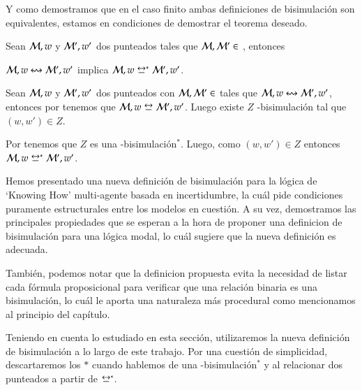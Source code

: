 Y como demostramos que en el caso finito ambas definiciones de bisimulación son equivalentes, estamos en condiciones de demostrar el teorema deseado. 

\begin{teorema}\label{thm:new-bisim-finite-equiv}
    Sean $\mathcal{M},w$ y $\mathcal{M}',w'$ dos \ultss punteados tales que $\mathcal{M}, \mathcal{M}' \in$ \MFD, entonces
    \begin{center}
        $\mathcal{M},w \mathrel{\leftrightsquigarrow} \mathcal{M}', w'$ implica $\model,w \bisim^* \model', w'$.
    \end{center}
\end{teorema}

\begin{demostracion}
    Sean $\mathcal{M},w$ y $\mathcal{M}',w'$ dos \ultss punteados con $\mathcal{M}, \mathcal{M}' \in $ \MFD tales que $\mathcal{M},w \mathrel{\leftrightsquigarrow} \mathcal{M}', w'$, 
    entonces por  tenemos que $\model,w \bisim \model', w'$. 
    Luego existe $Z$ \KHilogic-bisimulación tal que $(w,w') \in Z$.

    Por  tenemos que $Z$ es una \KHilogic-bisimulación$^*$. Luego, como $(w,w') \in Z$ 
    entonces $\model,w \bisim^* \model', w'$.
\end{demostracion}

Hemos presentado una nueva definición de bisimulación para la lógica de `Knowing How' multi-agente basada en incertidumbre, la 
cuál pide condiciones puramente estructurales entre los modelos en cuestión. A su vez, demostramos las principales propiedades que se 
esperan a la hora de proponer una definicion de bisimulación para una lógica modal, lo cuál sugiere que la nueva definición es adecuada.

También, podemos notar que la definicion propuesta evita la necesidad de listar cada fórmula proposicional para verificar que una relación binaria
es una bisimulación, lo cuál le aporta una naturaleza más procedural como mencionamos al principio del capítulo.  

Teniendo en cuenta lo estudiado en esta sección, utilizaremos la nueva definición de bisimulación a lo largo de este trabajo.
Por una cuestión de simplicidad, descartaremos los $*$ cuando hablemos de una \KHilogic-bisimulación$^*$ y 
al relacionar dos \ultss punteados a partir de $\bisim^*$.